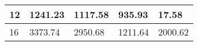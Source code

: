 \begin{table}
\begin{tabular}{|l|l|l|l|l|}
12                                                            & 1241.23                                                                                       & 1117.58                                                                                        & 935.93                                                                                                     & 17.58                                                                                         \\ \hline
16                                                            & 3373.74                                                                                             & 2950.68                                                                                        & 1211.64                                                                                                   & 2000.62                                                                                        \\ \hline
\end{tabular}
\end{table}



